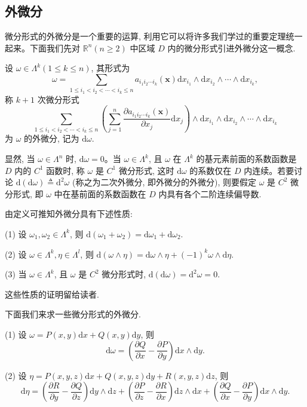 \subsection{外微分}
\label{subsec:ma-16-6-3}

微分形式的外微分是一个重要的运算, 利用它可以将许多我们学过的重要定理统一起来。下面我们先对 $\mathbb R^n(n\geqslant2)$ 中区域 $D$ 内的微分形式引进外微分这一概念.

\begin{definition}\label{definition:ma-16-6-1}
设 $\omega\in\Lambda^k(1\leqslant k\leqslant n)$, 其形式为
\[
  \omega=
  \sum_{1\leqslant i_1<i_2<\cdots<i_k\leqslant n}
  a_{i_1i_2\cdots i_k}(\boldsymbol x)
  \mathrm dx_{i_1}\wedge\mathrm dx_{i_2}\wedge\cdots\wedge\mathrm dx_{i_k},
\]
称 $k+1$ 次微分形式
\[
  \sum_{1\leqslant i_1<i_2<\cdots<i_k\leqslant n}
  \left(\sum_{j=1}^n\frac{\partial a_{i_1i_2\cdots i_k}(\boldsymbol x)}{\partial x_j}\mathrm dx_j\right)
  \wedge\mathrm dx_{i_1}\wedge\mathrm dx_{i_2}\wedge\cdots\wedge\mathrm dx_{i_k}
\]
为 $\omega$ 的外微分, 记为 $\mathrm d\omega$.
\end{definition}

显然, 当 $\omega\in\Lambda^n$ 时, $\mathrm d\omega=0$。当 $\omega\in\Lambda^k$, 且 $\omega$ 在 $\Lambda^k$ 的基元素前面的系数函数是 $D$ 内的 $C^1$ 函数时, 称 $\omega$ 是 $C^1$ 微分形式, 这时 $\mathrm d\omega$ 的系数仅在 $D$ 内连续。若要讨论 $\mathrm d(\mathrm d\omega)\triangleq\mathrm d^2\omega$ (称之为二次外微分, 即外微分的外微分), 则要假定 $\omega$ 是 $C^2$ 微分形式, 即 $\omega$ 中在基前面的系数函数在 $D$ 内具有各个二阶连续偏导数.

由定义可推知外微分具有下述性质:

(1) 设 $\omega_1,\omega_2\in\Lambda^k$, 则 $\mathrm d(\omega_1+\omega_2)=\mathrm d\omega_1+\mathrm d\omega_2$.

(2) 设 $\omega\in\Lambda^k,\eta\in\Lambda^l$, 则 $\mathrm d(\omega\wedge\eta)=\mathrm d\omega\wedge\eta+(-1)^k\omega\wedge\mathrm d\eta$.

(3) 当 $\omega\in\Lambda^k$, 且 $\omega$ 是 $C^2$ 微分形式时, $\mathrm d(\mathrm d\omega)=\mathrm d^2\omega=0$.

这些性质的证明留给读者.

下面我们来求一些微分形式的外微分.

(1) 设 $\omega=P(x,y)\mathrm dx+Q(x,y)\mathrm dy$, 则
\[
  \mathrm d\omega=\left(\frac{\partial Q}{\partial x}-\frac{\partial P}{\partial y}\right)\mathrm dx\wedge\mathrm dy.
\]

(2) 设 $\eta=P(x,y,z)\mathrm dx+Q(x,y,z)\mathrm dy+R(x,y,z)\mathrm dz$, 则
\[
  \mathrm d\eta=
  \left(\frac{\partial R}{\partial y}-\frac{\partial Q}{\partial z}\right)\mathrm dy\wedge\mathrm dz
  +
  \left(\frac{\partial P}{\partial z}-\frac{\partial R}{\partial x}\right)\mathrm dz\wedge\mathrm dx
  +
  \left(\frac{\partial Q}{\partial x}-\frac{\partial P}{\partial y}\right)\mathrm dx\wedge\mathrm dy.
\]

